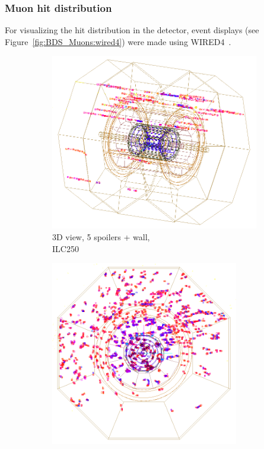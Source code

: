 \subsubsection{Muon hit distribution}
For visualizing the hit distribution in the \sid detector, event displays (see Figure~\ref{fig:BDS_Muons:wired4}) were made using WIRED4~\cite{Wired4}.
 \begin{figure}[htbp]
 \centering
  \begin{subfigure}[b]{0.31\textwidth}
   \centering
   \includegraphics[width=\textwidth]{Figures/BDS_muons/Event_display_ILC250_p_spoilers_wall_inverted.png}
   \caption{3D view, 5 spoilers + wall,\\ILC250}
   \end{subfigure}
   \hfill
   \begin{subfigure}[b]{0.31\textwidth}
   \centering
    \includegraphics[width=0.9\textwidth]{Figures/BDS_muons/muons_positron_5spoilers_wall_515_xyview_croped_inverted.png}

\end{subfigure}
\end{figure}
